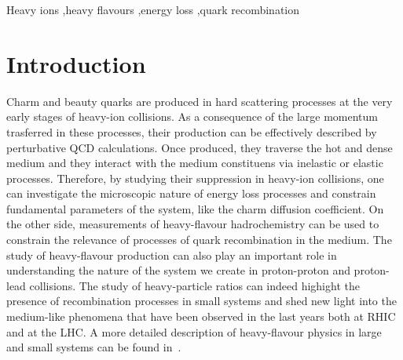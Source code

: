 \documentclass[3p,times,procedia]{elsarticle}
\begin{document}
\begin{frontmatter}
\begin{keyword}
Heavy ions \sep heavy flavours \sep energy loss \sep quark recombination
\end{keyword}
\end{frontmatter}


\section{Introduction}
\label{intro}
Charm and beauty quarks are produced in hard scattering processes at the very early stages of heavy-ion collisions. As a consequence of the 
large momentum trasferred in these processes, their production can be effectively described by perturbative QCD calculations. 
Once produced, they traverse the hot and dense medium and they interact with the medium constituens via inelastic or elastic processes.
Therefore, by studying their suppression in heavy-ion collisions, one can investigate the microscopic nature of energy loss processes
and constrain fundamental parameters of the system, like the charm diffusion coefficient. On the other side, measurements of 
heavy-flavour hadrochemistry can be used to constrain the relevance of processes of quark recombination in the medium.
The study of heavy-flavour production can also play an important role in understanding the nature of the system we create in proton-proton and 
proton-lead collisions. The study of heavy-particle ratios can indeed highight the presence of recombination 
processes in small systems and shed new light into the medium-like phenomena that have been observed in the last years both at RHIC and at the LHC. 
A more detailed description of heavy-flavour physics in large and small systems can be found in~\cite{saporegravis,prinorapp,yenjie}.
\end{document}
